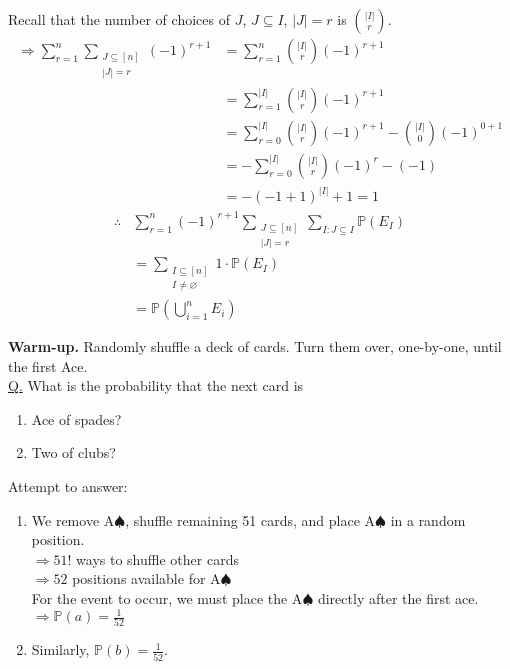 \documentclass[a4paper,11pt]{amsbook}
\makeatletter
\renewenvironment{proof}[1][\proofname]{\par
    \pushQED{\qed}%
    \normalfont \topsep6\p@\@plus6\p@\relax
    \trivlist
    \itemindent\z@ %
    \item[\hskip\labelsep
          \scshape
      #1\@addpunct{.}]\ignorespaces
}{%
    \popQED\endtrivlist\@endpefalse
}
\theoremstyle{definition}
\theoremstyle{remark}
\renewcommand{\P}{\mathbb{P}}
\newcommand\inc\subseteq
\newcommand\0{\varnothing}
\makeatother
\begin{document}
\begin{proof}
        Recall that the number of choices of $J$, $J\inc I$, $|J|=r$ is $\binom{|I|}r$.
        \begin{align*}
            \Rightarrow\sum_{r=1}^n\sum_{\substack{J\inc\left[n\right] \\ |J|=r}}(-1)^{r+1}
            &=\sum_{r=1}^n\binom{|I|}r(-1)^{r+1} \\
            &=\sum_{r=1}^{|I|}\binom{|I|}r(-1)^{r+1} \\
            &=\sum_{r=0}^{|I|}\binom{|I|}r(-1)^{r+1}-\binom{|I|}0(-1)^{0+1} \\
            &=-\sum_{r=0}^{|I|}\binom{|I|}r(-1)^r-(-1) \\
            &=-(-1+1)^{|I|}+1=1 \tag{binomial thm}
        \end{align*}
        \begin{align*}
            \therefore&\sum_{r=1}^n(-1)^{r+1}\sum_{\substack{J\inc\left[n\right] \\ |J|=r}}\sum_{I:J\inc I}\P\left(E_I\right) \\
            &=\sum_{\substack{I\inc\left[n\right] \\ I\neq\varnothing}}1\cdot\P(E_I) \\ 
            &=\P\left(\bigcup_{i=1}^nE_i\right) \tag{*}
        \end{align*}
    \end{proof}

    \noindent \textbf{Warm-up.} Randomly shuffle a deck of cards.
    Turn them over, one-by-one, until the first Ace.\\
    \underline{Q.} What is the probability that the next card is
    \begin{enumerate}
        \item Ace of spades?
        \item Two of clubs?
    \end{enumerate}
    Attempt to answer:
    \begin{enumerate}
        \item We remove A$\spadesuit$, shuffle remaining 51 cards, and place A$\spadesuit$ in a random position.\\
        $\Rightarrow51!$ ways to shuffle other cards\\
        $\Rightarrow52$ positions available for A$\spadesuit$\\
        For the event to occur, we must place the A$\spadesuit$ directly after the first ace.\\
        $\Rightarrow\P(a)=\frac1{52}$
        \item Similarly, $\P(b)=\frac1{52}$.
    \end{enumerate}
\end{document}
